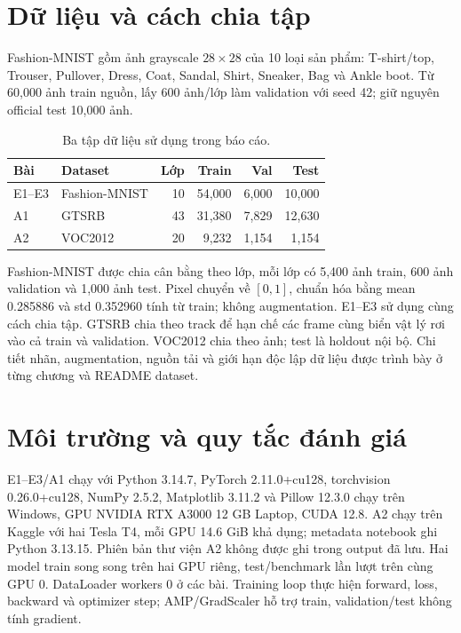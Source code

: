 \documentclass[12pt,a4paper,oneside]{report}
\begin{document}
\section{Dữ liệu và cách chia tập}
Fashion-MNIST \cite{fashion} gồm ảnh grayscale $28\times28$ của 10 loại
sản phẩm: T-shirt/top, Trouser, Pullover, Dress, Coat, Sandal, Shirt, Sneaker,
Bag và Ankle boot. Từ 60,000 ảnh train nguồn, lấy 600 ảnh/lớp làm validation
với seed 42; giữ nguyên official test 10,000 ảnh.
\begin{table}[H]\centering\caption{Ba tập dữ liệu sử dụng trong báo cáo.}
\small\begin{tabular}{llrrrr}\toprule
Bài & Dataset & Lớp & Train & Val & Test\\\midrule
E1--E3 &Fashion-MNIST&10&54,000&6,000&10,000\\
A1 &GTSRB&43&31,380&7,829&12,630\\
A2 &VOC2012&20&9,232&1,154&1,154\\\bottomrule
\end{tabular}\label{table:main-2}
\end{table}
Fashion-MNIST được chia cân bằng theo lớp, mỗi lớp có 5,400 ảnh train,
600 ảnh validation và 1,000 ảnh test. Pixel chuyển
về $[0,1]$, chuẩn hóa bằng mean 0.285886 và std 0.352960 tính từ train;
không augmentation. E1--E3 sử dụng cùng cách chia tập.
GTSRB chia theo track để hạn chế các frame cùng biển vật lý rơi vào cả
train và validation. VOC2012 chia theo ảnh; test là holdout nội bộ.
Chi tiết nhãn, augmentation, nguồn tải và giới hạn độc lập dữ liệu được
trình bày ở từng chương và README dataset.

\section{Môi trường và quy tắc đánh giá}
E1--E3/A1 chạy với Python 3.14.7, PyTorch 2.11.0+cu128, torchvision 0.26.0+cu128,
NumPy 2.5.2, Matplotlib 3.11.2 và Pillow 12.3.0 chạy trên Windows,
GPU NVIDIA RTX A3000 12 GB Laptop, CUDA 12.8.
A2 chạy trên Kaggle với hai Tesla T4, mỗi GPU 14.6 GiB khả dụng;
metadata notebook ghi Python 3.13.15. Phiên bản thư viện A2 không được
ghi trong output đã lưu. Hai model train song song trên hai GPU riêng,
test/benchmark lần lượt trên cùng GPU 0. DataLoader workers 0 ở các bài.
Training loop thực hiện forward, loss, backward và optimizer step;
AMP/GradScaler hỗ trợ train, validation/test không tính gradient.
\end{document}
